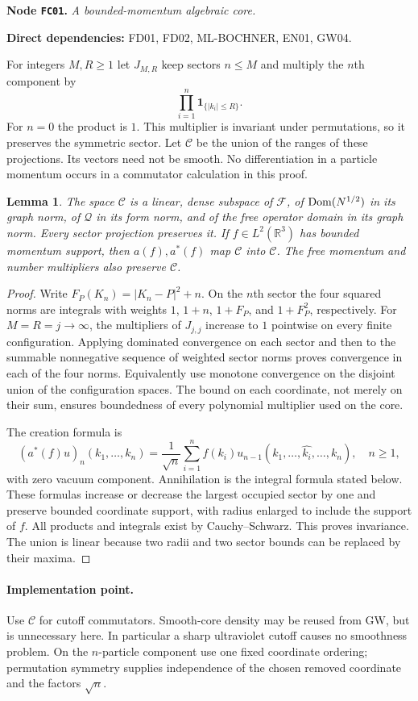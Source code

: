 \documentclass[11pt,a4paper]{article}
\newtheorem{lemma}[theorem]{Lemma}
\theoremstyle{remark}\newtheorem{remark}[theorem]{Remark}
\newcommand{\R}{\mathbb R}\newcommand{\C}{\mathbb C}\newcommand{\N}{\mathbb N}
\newcommand{\F}{\mathcal F}\newcommand{\Q}{\mathcal Q}\newcommand{\HH}{\mathcal H}
\newcommand{\abs}[1]{\lvert #1\rvert}\newcommand{\rankone}[2]{\lvert #1\rangle\langle #2\rvert}
\newcommand{\node}[3]{\par\Needspace{6\baselineskip}\smallskip\hypertarget{node:#1}{}\label{nodepage:#1}\noindent\textbf{Node \texttt{#1}.} \textit{#2.}\par\noindent\textbf{Direct dependencies:} #3.\par}
\begin{document}
\node{FC01}{A bounded-momentum algebraic core}{FD01, FD02, ML-BOCHNER, EN01, GW04}
For integers $M,R\geq1$ let $J_{M,R}$ keep sectors $n\leq M$ and multiply the $n$th component by
\[
 \prod_{i=1}^{n}\mathbf1_{\{\abs{k_i}\leq R\}}.
\]
For $n=0$ the product is $1$. This multiplier is invariant under permutations, so it preserves the symmetric sector. Let $\mathscr C$ be the union of the ranges of these projections. Its vectors need not be smooth. No differentiation in a particle momentum occurs in a commutator calculation in this proof.

\begin{lemma}\label{lem:boundedcore}
The space $\mathscr C$ is a linear, dense subspace of $\F$, of $\operatorname{Dom}(N^{1/2})$ in its graph norm, of $\Q$ in its form norm, and of the free operator domain in its graph norm. Every sector projection preserves it. If $f\in L^2(\R^3)$ has bounded momentum support, then $a(f),a^*(f)$ map $\mathscr C$ into $\mathscr C$. The free momentum and number multipliers also preserve $\mathscr C$.
\end{lemma}
\begin{proof}
Write $F_P(K_n)=\abs{K_n-P}^2+n$. On the $n$th sector the four squared norms are integrals with weights $1$, $1+n$, $1+F_P$, and $1+F_P^2$, respectively. For $M=R=j\to\infty$, the multipliers of $J_{j,j}$ increase to $1$ pointwise on every finite configuration. Applying dominated convergence on each sector and then to the summable nonnegative sequence of weighted sector norms proves convergence in each of the four norms. Equivalently use monotone convergence on the disjoint union of the configuration spaces. The bound on each coordinate, not merely on their sum, ensures boundedness of every polynomial multiplier used on the core.

The creation formula is
\[
 (a^*(f)u)_n(k_1,\ldots,k_n)
 =\frac1{\sqrt n}\sum_{i=1}^{n}f(k_i)
           u_{n-1}(k_1,\ldots,\widehat{k_i},\ldots,k_n),\quad n\geq1,
\]
with zero vacuum component. Annihilation is the integral formula stated below. These formulas increase or decrease the largest occupied sector by one and preserve bounded coordinate support, with radius enlarged to include the support of $f$. All products and integrals exist by Cauchy--Schwarz. This proves invariance. The union is linear because two radii and two sector bounds can be replaced by their maxima.
\end{proof}
\paragraph{Implementation point.}
Use $\mathscr C$ for cutoff commutators. Smooth-core density may be reused from GW, but is unnecessary here. In particular a sharp ultraviolet cutoff causes no smoothness problem. On the $n$-particle component use one fixed coordinate ordering; permutation symmetry supplies independence of the chosen removed coordinate and the factors $\sqrt n$.
\end{document}
